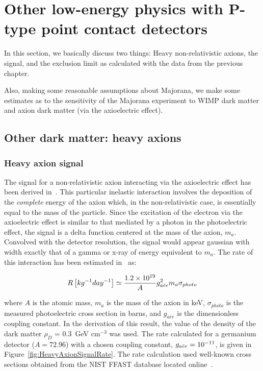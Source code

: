 \chapter{Other low-energy physics with P-type point contact detectors}

In this section, we basically discuss two things: Heavy non-relativistic axions, the signal, and the exclusion limit as calculated with the data from the previous chapter.

Also, making some reasonable assumptions about Majorana, we make some estimates as to the sensitivity of the Majorana experiment to WIMP dark matter and axion dark matter (via the axioelectric effect).  

		
	\section{Other dark matter: heavy axions}
	\label{sec:CalcLimitsOnHeavyAxions}		
		


	\subsection{Heavy axion signal}
	\label{sec:CalcLimitsOnHeavyAxionSignal}		

	The signal for a non-relativistic axion interacting via the axioelectric effect has been derived in~\cite{Pospelov:2008jk}.  This particular inelastic interaction involves the deposition of the \emph{complete} energy of the axion which, in the non-relativistic case, is essentially equal to the mass of the particle.  Since the excitation of the electron via the axioelectric effect is similar to that mediated by a photon in the photoelectric effect, the signal is a delta function centered at the mass of the axion, $m_{a}$.  Convolved with the detector resolution, the signal would appear gaussian with width exactly that of a gamma or x-ray of energy equivalent to $m_{a}$.  The rate of this interaction has been estimated in~\cite{Pospelov:2008jk} as:
	
		\begin{equation}
			R \left[ kg^{-1} day^{-1} \right]\simeq \frac{1.2\times 10^{19}}{A} g_{a\bar{e}e}^{2} m_a \sigma_{photo}
			\label{eqn:AxioelectricRate}
		\end{equation}

where $A$ is the atomic mass, $m_{a}$ is the mass of the axion in keV, $\sigma_{photo}$ is the measured photoelectric cross section in barns, and $g_{a\bar{e}e}$ is the dimensionless coupling constant.  In the derivation of this result, the value of the density of the dark matter $\rho_{D}$ = 0.3~GeV cm$^{-3}$ was used.  The rate calculated for a germanium detector ($A=72.96$) with a chosen coupling constant, $g_{a\bar{e}e} = 10^{-11}$, is given in Figure~\ref{fig:HeavyAxionSignalRate}.  The rate calculation used well-known cross sections obtained from the NIST FFAST database located online~\cite{chantler:597}.  

